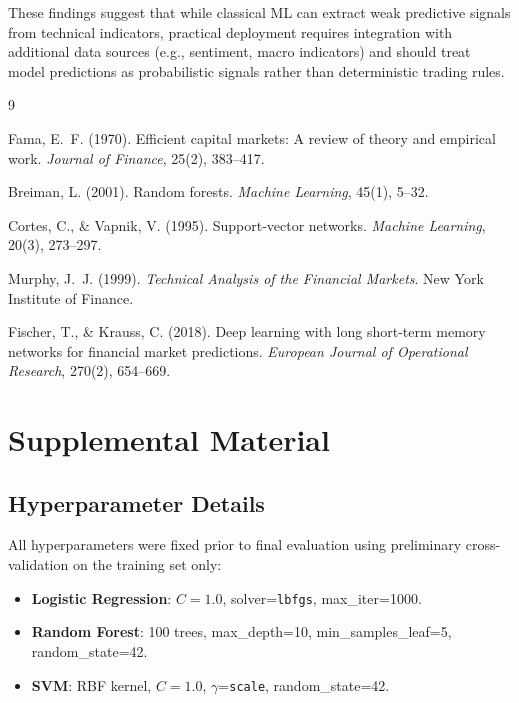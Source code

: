 \documentclass{article}
\begin{document}
These findings suggest that while classical ML can extract weak predictive
signals from technical indicators, practical deployment requires integration
with additional data sources (e.g., sentiment, macro indicators) and should
treat model predictions as probabilistic signals rather than deterministic
trading rules.


\begin{thebibliography}{9}

Fama, E.~F. (1970).
\newblock Efficient capital markets: A review of theory and empirical work.
\newblock \emph{Journal of Finance}, 25(2), 383--417.

Breiman, L. (2001).
\newblock Random forests.
\newblock \emph{Machine Learning}, 45(1), 5--32.

Cortes, C., \& Vapnik, V. (1995).
\newblock Support-vector networks.
\newblock \emph{Machine Learning}, 20(3), 273--297.

Murphy, J.~J. (1999).
\newblock \emph{Technical Analysis of the Financial Markets}.
\newblock New York Institute of Finance.

Fischer, T., \& Krauss, C. (2018).
\newblock Deep learning with long short-term memory networks for financial
market predictions.
\newblock \emph{European Journal of Operational Research}, 270(2), 654--669.

\end{thebibliography}

\appendix
\section{Supplemental Material}

\subsection{Hyperparameter Details}

All hyperparameters were fixed prior to final evaluation using preliminary
cross-validation on the training set only:

\begin{itemize}
    \item \textbf{Logistic Regression}: $C=1.0$, solver=\texttt{lbfgs},
    max\_iter=1000.
    \item \textbf{Random Forest}: 100 trees, max\_depth=10,
    min\_samples\_leaf=5, random\_state=42.
    \item \textbf{SVM}: RBF kernel, $C=1.0$, $\gamma$=\texttt{scale},
    random\_state=42.
\end{itemize}
\end{document}
